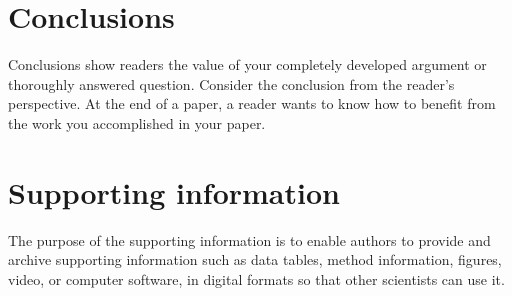 \documentclass[11pt, a4paper]{article}
\begin{document}
\section{Conclusions}
Conclusions show readers the value of your completely developed argument or thoroughly answered question. Consider the conclusion from the reader's perspective. At the end of a paper, a reader wants to know how to benefit from the work you accomplished in your paper. 

\appendix
\section{Supporting information}
The purpose of the supporting information is to enable authors to provide and archive supporting information such as data tables, method information, figures, video, or computer software, in digital formats so that other scientists can use it.

\small \singlespacing
 

\end{document}
